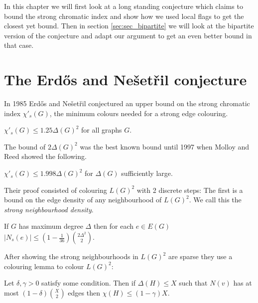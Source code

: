 In this chapter we will first look at a long standing conjecture which claims to bound
the strong chromatic index and show how we used local flags to get the closest yet bound.
Then in section \ref{sec:sec_bipartite} we will look at the bipartite version of the
conjecture and adapt our argument to get an even better bound in that case.

\section{The Erd\H{o}s and Nešetřil conjecture}

In 1985 Erd\H{o}s and Nešetřil \cite{faudreeInducedMatchingsBipartite1989} conjectured an
upper bound on the strong chromatic index $\chi'_s(G)$, the minimum colours needed for
a strong edge colouring.

\begin{conjecture}
    $\chi'_s(G) \leq 1.25\Delta(G)^2$ for all graphs $G$.
\end{conjecture}

The bound of $2\Delta(G)^2$ was the best known bound until 1997 when Molloy and Reed
showed the following.
\begin{knowntheorem}
    $\chi'_s(G) \leq 1.998\Delta(G)^2$ for $\Delta(G)$ sufficiently large.
\end{knowntheorem}

Their proof consisted of colouring $L(G)^2$ with 2 discrete steps:
The first is a bound on the edge density of any neighbourhood of $L(G)^2$. We call
this the \textit{strong neighbourhood density}.
\begin{knownlemma}
    If $G$ has maximum degree $\Delta$ then for each $e\in E(G)$
    $|N_s(e)| \leq (1-\frac{1}{36})\binom{2\Delta^2}{2}$.
\end{knownlemma}
After showing the strong neighbourhoods in $L(G)^2$ are sparse they use a colouring
lemma to colour $L(G)^2$:
\begin{knownlemma}
    Let $\delta, \gamma > 0$ satisfy some condition. Then if
    $\Delta(H) \leq X$ such that $N(v)$ has at most $(1-\delta)\binom{X}{2}$ edges
    then $\chi(H)\leq (1-\gamma)X$.
\end{knownlemma}

